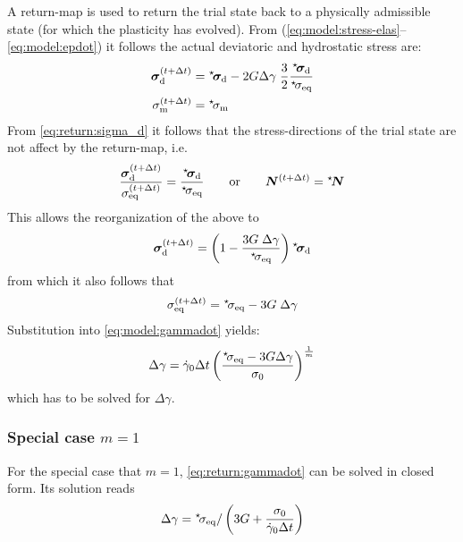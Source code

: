 \documentclass[times,namecite]{goose-article}
\newcommand\leftstar[1]{\hspace*{-.3em}~^\star\!#1}
\begin{document}
A return-map is used to return the trial state back to a physically admissible state (for which the plasticity has evolved). From (\ref{eq:model:stress-elas}--\ref{eq:model:epdot}) it follows the actual deviatoric and hydrostatic stress are:
\begin{align}
  \label{eq:return:sigma_d}
  \bm{\sigma}_\mathrm{d}^{(t+\Delta t)}
  &=
  \leftstar{\bm{\sigma}}_\mathrm{d} - 2 G \Delta \gamma \;
  \frac{3}{2}
  \frac{
    \leftstar{\bm{\sigma}}_\mathrm{d}
  }{
    \leftstar{\sigma}_\mathrm{eq}
  }
  \\
  \sigma_\mathrm{m}^{(t+\Delta t)} &= \leftstar{\sigma}_\mathrm{m}
\end{align}
From \eqref{eq:return:sigma_d} it follows that the stress-directions of the trial state are not affect by the return-map, i.e.
\begin{equation}
  \frac{
    \bm{\sigma}_\mathrm{d}^{(t+\Delta t)}
  }{
    \sigma_\mathrm{eq}^{(t+\Delta t)}
  } =
  \frac{
    \leftstar{\bm{\sigma}}_\mathrm{d}
  }{
    \leftstar{\sigma}_\mathrm{eq}
  }
  \qquad\mathrm{or}\qquad
  \bm{N}^{(t+\Delta t)} = \leftstar{\bm{N}}
\end{equation}
This allows the reorganization of the above to
\begin{equation}
  \bm{\sigma}_\mathrm{d}^{(t+\Delta t)}
  =
  \left(
    1 -
    \frac{
      3 G \; \Delta \gamma
    }{
      \leftstar{\sigma}_\mathrm{eq}
    }
  \right)
  \leftstar{\bm{\sigma}}_\mathrm{d}
\end{equation}
from which it also follows that
\begin{equation}
  \sigma_\mathrm{eq}^{(t+\Delta t)}
  =
  \leftstar{\sigma}_\mathrm{eq} - 3 G \; \Delta \gamma
\end{equation}
Substitution into \eqref{eq:model:gammadot} yields:
\begin{equation}\label{eq:return:gammadot}
  \Delta \gamma
  =
  \dot{\gamma}_0 \Delta t \left(
    \frac{
      \leftstar{\sigma_\mathrm{eq}} - 3 G \Delta \gamma
    }{
      \sigma_0
    }
  \right)^{\frac{1}{m}}
\end{equation}
which has to be solved for $\Delta \gamma$.

\subsubsection{Special case $m = 1$}

For the special case that $m = 1$, \eqref{eq:return:gammadot} can be solved in closed form. Its solution reads
\begin{equation}
\Delta \gamma =
\leftstar{\sigma}_\mathrm{eq} /
\left(
  3 G + \frac{\sigma_0}{\dot{\gamma}_0 \Delta t}
\right)
\end{equation}
\end{document}
